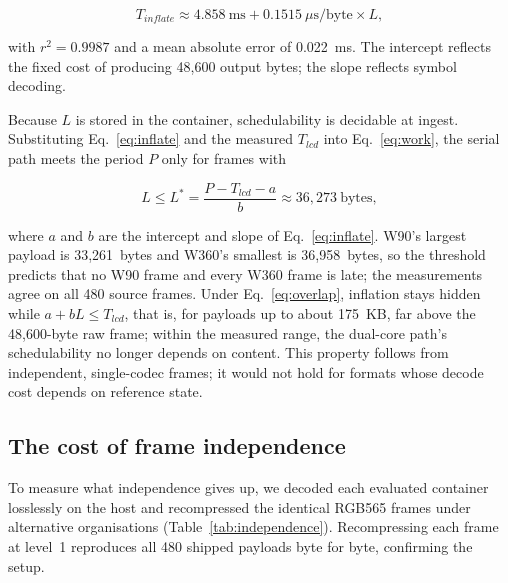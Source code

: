 \documentclass[11pt,twocolumn]{article}
\begin{document}
\begin{equation}
T_{inflate}\approx 4.858\ \text{ms} + 0.1515\ \mu\text{s/byte}\times L,
\label{eq:inflate}
\end{equation}

with $r^2=0.9987$ and a mean absolute error of 0.022~ms.  The intercept
reflects the fixed cost of producing 48,600 output bytes; the slope reflects
symbol decoding.

Because $L$ is stored in the container, schedulability is decidable at
ingest.  Substituting Eq.~\eqref{eq:inflate} and the measured $T_{lcd}$ into
Eq.~\eqref{eq:work}, the serial path meets the period $P$ only for frames with

\begin{equation}
L \le L^{*}=\frac{P-T_{lcd}-a}{b}\approx 36{,}273\ \text{bytes},
\label{eq:threshold}
\end{equation}

where $a$ and $b$ are the intercept and slope of Eq.~\eqref{eq:inflate}.
W90's largest payload is 33,261~bytes and W360's smallest is 36,958~bytes, so
the threshold predicts that no W90 frame and every W360 frame is late; the
measurements agree on all 480 source frames.  Under Eq.~\eqref{eq:overlap},
inflation stays hidden while $a+bL\le T_{lcd}$, that is, for payloads up to
about 175~KB, far above the 48,600-byte raw frame; within the measured range,
the dual-core path's schedulability no longer depends on content.  This property follows from
independent, single-codec frames; it would not hold for formats whose decode
cost depends on reference state.

\subsection{The cost of frame independence}
\label{sec:independence}

To measure what independence gives up, we decoded each evaluated container
losslessly on the host and recompressed the identical RGB565 frames under
alternative organisations (Table~\ref{tab:independence}).  Recompressing each
frame at level~1 reproduces all 480 shipped payloads byte for byte,
confirming the setup.
\end{document}
